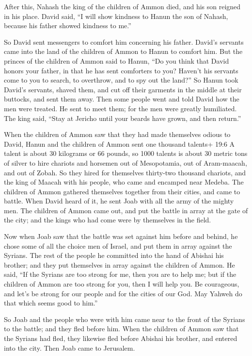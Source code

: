  After this, Nahash the king of the children of Ammon died,
and his son reigned in his place.  David said, ``I will show
kindness to Hanun the son of Nahash, because his father showed kindness
to me.''

So David sent messengers to comfort him concerning his father. David's
servants came into the land of the children of Ammon to Hanun to comfort
him.  But the princes of the children of Ammon said to
Hanun, ``Do you think that David honors your father, in that he has sent
comforters to you? Haven't his servants come to you to search, to
overthrow, and to spy out the land?''  So Hanun took David's
servants, shaved them, and cut off their garments in the middle at their
buttocks, and sent them away.  Then some people went and
told David how the men were treated. He sent to meet them; for the men
were greatly humiliated. The king said, ``Stay at Jericho until your
beards have grown, and then return.''

 When the children of Ammon saw that they had made
themselves odious to David, Hanun and the children of Ammon sent one
thousand talents+ 19:6 A talent is about 30 kilograms or 66 pounds, so
1000 talents is about 30 metric tons of silver to hire chariots and
horsemen out of Mesopotamia, out of Aram-maacah, and out of Zobah.
 So they hired for themselves thirty-two thousand chariots,
and the king of Maacah with his people, who came and encamped near
Medeba. The children of Ammon gathered themselves together from their
cities, and came to battle.  When David heard of it, he sent
Joab with all the army of the mighty men.  The children of
Ammon came out, and put the battle in array at the gate of the city; and
the kings who had come were by themselves in the field.

 Now when Joab saw that the battle was set against him
before and behind, he chose some of all the choice men of Israel, and
put them in array against the Syrians.  The rest of the
people he committed into the hand of Abishai his brother; and they put
themselves in array against the children of Ammon.  He
said, ``If the Syrians are too strong for me, then you are to help me;
but if the children of Ammon are too strong for you, then I will help
you.  Be courageous, and let's be strong for our people and
for the cities of our God. May Yahweh do that which seems good to him.''

 So Joab and the people who were with him came near to the
front of the Syrians to the battle; and they fled before him.
 When the children of Ammon saw that the Syrians had fled,
they likewise fled before Abishai his brother, and entered into the
city. Then Joab came to Jerusalem.


